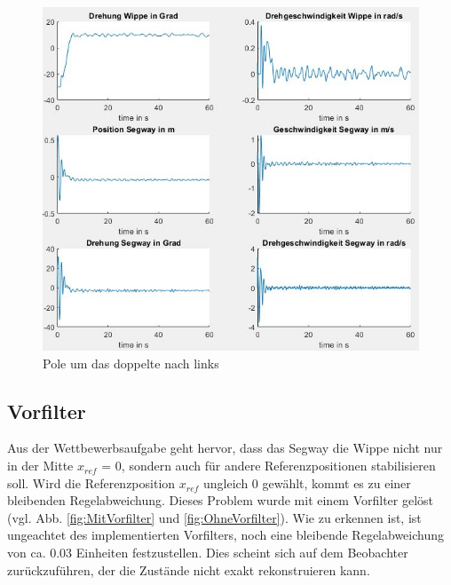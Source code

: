 \documentclass[pdf]{ifacconf}
\begin{document}
\begin{figure}[h]	
\centerline{\includegraphics[width=\linewidth]{Bilder/Regler1mal2.jpg}}
	\caption{Pole um das doppelte nach links}	\label{fig:Rauschen2}
\end{figure}




	\subsection{Vorfilter}
	Aus der Wettbewerbsaufgabe geht hervor, dass das Segway die Wippe nicht nur in der Mitte $x^{}_{ref}$ = 0, sondern auch für andere Referenzpositionen stabilisieren soll. Wird die Referenzposition $x^{}_{ref}$ ungleich 0 gewählt, kommt es zu einer bleibenden Regelabweichung. Dieses Problem wurde mit einem Vorfilter gelöst (vgl. Abb. \ref{fig:MitVorfilter} und \ref{fig:OhneVorfilter}). Wie zu erkennen ist, 
	ist ungeachtet des implementierten Vorfilters, noch eine bleibende Regelabweichung von ca. 0.03 Einheiten festzustellen. Dies scheint sich auf dem Beobachter zurückzuführen, der die Zustände nicht exakt rekonstruieren kann.  
\end{document}
